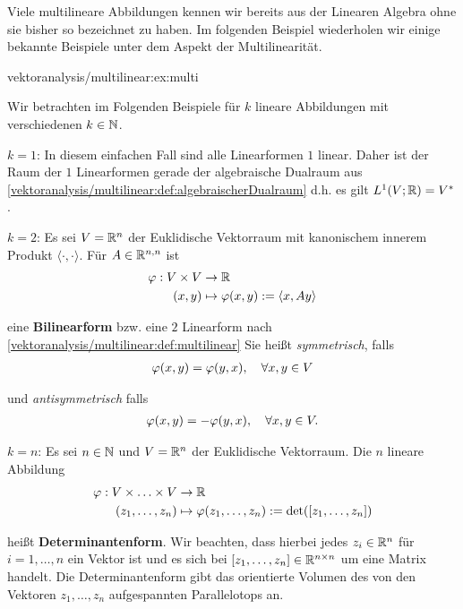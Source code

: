 \par
Viele multilineare Abbildungen kennen wir bereits aus der Linearen Algebra ohne sie bisher so bezeichnet zu haben.
Im folgenden Beispiel wiederholen wir einige bekannte Beispiele unter dem Aspekt der Multilinearität.
\begin{example}{}{vektoranalysis/multilinear:ex:multi}



\par
Wir betrachten im Folgenden Beispiele für \(k\) lineare Abbildungen mit verschiedenen \(k\in\mathbb{N}\).

\par
\textbf{\(k=1\)}: In diesem einfachen Fall sind alle Linearformen \(1\) linear.
Daher ist der Raum der \(1\) Linearformen gerade der algebraische Dualraum aus \cref{vektoranalysis/multilinear:def:algebraischerDualraum}  d.h. es gilt \(L^1(V; \mathbb{R}) = V^\ast\).

\par

\textbf{\(k=2\)}: Es sei \(V=\mathbb{R}^n\) der Euklidische Vektorraum mit kanonischem innerem Produkt \(\langle\cdot,\cdot\rangle\).
Für \(A\in\mathbb{R}^{n,n}\) ist
\begin{align*}
\varphi:V\times V &\to\mathbb{R}\\ 
(x,y) &\mapsto \varphi(x, y) :=\langle x,A y \rangle
\end{align*}
\par
eine \textbf{Bilinearform} bzw. eine \(2\) Linearform nach \cref{vektoranalysis/multilinear:def:multilinear} 
Sie heißt \emph{symmetrisch}, falls
\begin{align*}
\varphi(x, y) = \varphi(y, x), \quad \forall x, y\in V
\end{align*}
\par
und \emph{antisymmetrisch} falls
\begin{align*}
\varphi(x, y) = -\varphi(y, x), \quad \forall x, y\in V.
\end{align*}
\par

\textbf{\(k=n\)}: Es sei \(n\in \mathbb{N}\) und \(V=\mathbb{R}^n\) der Euklidische Vektorraum.
Die \(n\) lineare Abbildung
\begin{align*}
\varphi :V \times \ldots \times V &\to\mathbb{R}\\ 
(z_1, \ldots, z_n) &\mapsto \varphi(z_1,\ldots,z_n) := \det([z_1,\ldots,z_n])
\end{align*}
\par
heißt \textbf{Determinantenform}.
Wir beachten, dass hierbei jedes \(z_i \in \mathbb{R}^n\) für \(i=1,\ldots,n\) ein Vektor ist und es sich bei \([z_1,\ldots,z_n] \in \mathbb{R}^{n\times n}\) um eine Matrix handelt.
Die Determinantenform gibt das orientierte Volumen des von den Vektoren \(z_1,\ldots,z_n\) aufgespannten Parallelotops an.
\end{example}


